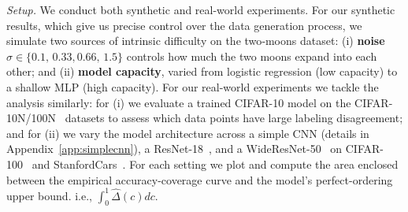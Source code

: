 \emph{Setup.}  
We conduct both synthetic and real-world experiments. For our synthetic results, which give us precise control over the data generation process, we simulate two sources of intrinsic difficulty on the two‑moons dataset:
(i) \textbf{noise $\sigma \in \{0.1,\,0.33,0.66,\,1.5\}$} controls how much the two moons expand into each other; and
(ii) \textbf{model capacity}, varied from logistic regression
(low capacity) to a shallow MLP (high capacity). For our real-world experiments we tackle the analysis similarly: for (i) we evaluate a trained CIFAR-10 model on the CIFAR-10N/100N~\citep{wei2021learning} datasets to assess which data points have large labeling disagreement; and for (ii) we vary the model architecture across a simple CNN (details in Appendix~\ref{app:simplecnn}), a ResNet-18~\citep{he2016deep}, and a WideResNet-50~\citep{zagoruyko2016wide} on CIFAR-100~\citep{krizhevsky2009learning} and StanfordCars~\citep{krause20133d}. For each setting we plot and compute the area enclosed between the empirical accuracy-coverage curve and the model's perfect-ordering upper bound. i.e., \(\int_0^1 \widehat{\Delta}(c)dc\).

